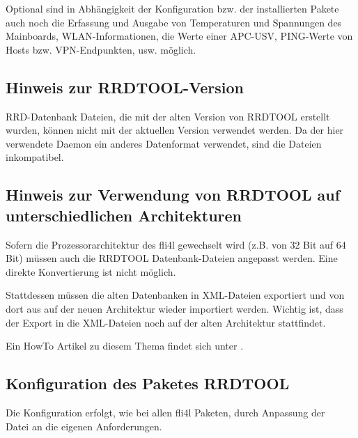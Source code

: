 Optional sind in Abhängigkeit der Konfiguration bzw. der installierten 
Pakete auch noch die Erfassung und Ausgabe von Temperaturen und Spannungen des 
Mainboards, WLAN-Informationen, die Werte einer APC-USV, PING-Werte von Hosts 
bzw. VPN-Endpunkten, usw. möglich. 

\subsection {Hinweis zur RRDTOOL-Version}

  RRD-Datenbank Dateien, die mit der alten Version von RRDTOOL erstellt wurden,
  können nicht mit der aktuellen Version verwendet werden. Da der hier verwendete
  Daemon ein anderes Datenformat verwendet, sind die Dateien inkompatibel.

\subsection {Hinweis zur Verwendung von RRDTOOL auf unterschiedlichen
Architekturen}

  Sofern die Prozessorarchitektur des fli4l gewechselt wird (z.B. von 32 Bit auf
  64 Bit) müssen auch die RRDTOOL Datenbank-Dateien angepasst werden. Eine
  direkte Konvertierung ist nicht möglich.
   
  Stattdessen müssen die alten Datenbanken in XML-Dateien exportiert und von
  dort aus auf der neuen Architektur wieder importiert werden. Wichtig ist, dass
  der Export in die XML-Dateien noch auf der alten Architektur stattfindet.

  Ein HowTo Artikel zu diesem Thema findet sich unter
  .

\subsection {Konfiguration des Paketes RRDTOOL}
     
  Die Konfiguration erfolgt, wie bei allen fli4l Paketen, durch Anpassung der \\
  Datei  
  an die eigenen Anforderungen.

